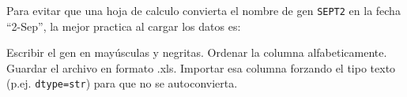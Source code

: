 \documentclass[12pt,addpoints]{exam}
\begin{document}
\begin{questions}
\question[1] Para evitar que una hoja de calculo convierta el nombre de gen
\texttt{SEPT2} en la fecha ``2-Sep'', la mejor practica al cargar los datos es:
\begin{choices}
  \choice Escribir el gen en may\'usculas y negritas.
  \choice Ordenar la columna alfabeticamente.
  \choice Guardar el archivo en formato .xls.
  \CorrectChoice Importar esa columna forzando el tipo texto (p.ej.
    \texttt{dtype=str}) para que no se autoconvierta.
\end{choices}

\end{questions}
\end{document}
